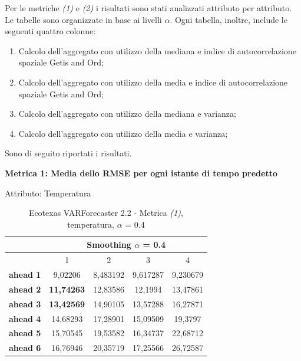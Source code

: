 \documentclass[12pt,a4paper,oneside,openright]{book}
\begin{document}
Per le metriche \textit{(1)} e \textit{(2)} i risultati sono stati analizzati attributo per attributo. Le tabelle sono organizzate in base ai livelli $\alpha$. Ogni tabella, inoltre, include le seguenti quattro colonne:

\begin{enumerate}
\item Calcolo dell'aggregato con utilizzo della mediana e indice di autocorrelazione spaziale Getis and Ord;
\item Calcolo dell'aggregato con utilizzo della media e indice di autocorrelazione spaziale Getis and Ord;
\item Calcolo dell'aggregato con utilizzo della mediana e varianza;
\item Calcolo dell'aggregato con utilizzo della media e varianza;
\end{enumerate}

Sono di seguito riportati i risultati.

\medskip

\textbf{Metrica 1: Media dello RMSE per ogni istante di tempo predetto} \medskip

Attributo: Temperatura \\ 

\begin{table}[H]
\centering
\begin{tabular}{|c|c|c|c|c|}
\hline
 & \multicolumn{4}{|c|}{Smoothing $\alpha$ = 0.4} \\
\hline
& 1 & 2 & 3 & 4 \\
\hline
\textbf{ahead 1} & 9,02206 & 8,483192 & 9,617287 & 9,230679\\
\hline
\textbf{ahead 2} & \textbf{11,74263} & 12,83586 & 12,1994 & 13,47861\\ 
\hline
\textbf{ahead 3} & \textbf{13,42569} & 14,90105 & 13,57288 & 16,27871\\
\hline
\textbf{ahead 4} & 14,68293 & 17,28901 & 15,09509 & 19,3797\\ 
\hline
\textbf{ahead 5} & 15,70545 & 19,53582 & 16,34737 & 22,68712\\
\hline
\textbf{ahead 6} & 16,76946 & 20,35719 & 17,25566 & 26,72587\\ 
\hline
\end{tabular} \\
\caption{Ecotexas VARForecaster 2.2 - Metrica \textit{(1)}, temperatura, $\alpha$ = 0.4}
\end{table} 

\newpage
\end{document}
